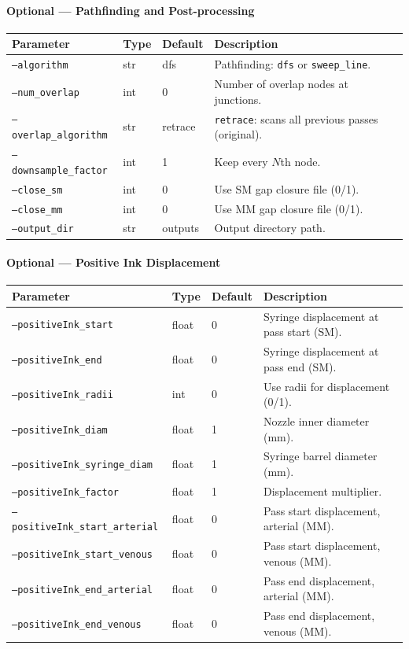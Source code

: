 \documentclass[11pt,letterpaper]{article}
\newcommand{\code}[1]{\texttt{#1}}
\begin{document}
\paragraph{Optional --- Pathfinding and Post-processing}

\begin{longtable}{@{}L{3.8cm} l l L{4.8cm}@{}}
\toprule
\textbf{Parameter} & \textbf{Type} & \textbf{Default} & \textbf{Description} \\
\midrule
\code{--algorithm} & str & dfs & Pathfinding: \code{dfs} or \code{sweep\_line}. \\
\code{--num\_overlap} & int & 0 & Number of overlap nodes at junctions. \\
\code{--overlap\_algorithm} & str & retrace & \code{retrace}: scans all previous passes (original). \\
\code{--downsample\_factor} & int & 1 & Keep every $N$th node. \\
\code{--close\_sm} & int & 0 & Use SM gap closure file (0/1). \\
\code{--close\_mm} & int & 0 & Use MM gap closure file (0/1). \\
\code{--output\_dir} & str & outputs & Output directory path. \\
\bottomrule
\end{longtable}

\paragraph{Optional --- Positive Ink Displacement}

{\footnotesize
\begin{longtable}{@{}L{4.8cm} l l L{4cm}@{}}
\toprule
\textbf{Parameter} & \textbf{Type} & \textbf{Default} & \textbf{Description} \\
\midrule
\code{--positiveInk\_start} & float & 0 & Syringe displacement at pass start (SM). \\
\code{--positiveInk\_end} & float & 0 & Syringe displacement at pass end (SM). \\
\code{--positiveInk\_radii} & int & 0 & Use radii for displacement (0/1). \\
\code{--positiveInk\_diam} & float & 1 & Nozzle inner diameter (mm). \\
\code{--positiveInk\_syringe\_diam} & float & 1 & Syringe barrel diameter (mm). \\
\code{--positiveInk\_factor} & float & 1 & Displacement multiplier. \\
\code{--positiveInk\_start\_arterial} & float & 0 & Pass start displacement, arterial (MM). \\
\code{--positiveInk\_start\_venous} & float & 0 & Pass start displacement, venous (MM). \\
\code{--positiveInk\_end\_arterial} & float & 0 & Pass end displacement, arterial (MM). \\
\code{--positiveInk\_end\_venous} & float & 0 & Pass end displacement, venous (MM). \\
\bottomrule
\end{longtable}
}%
\end{document}
